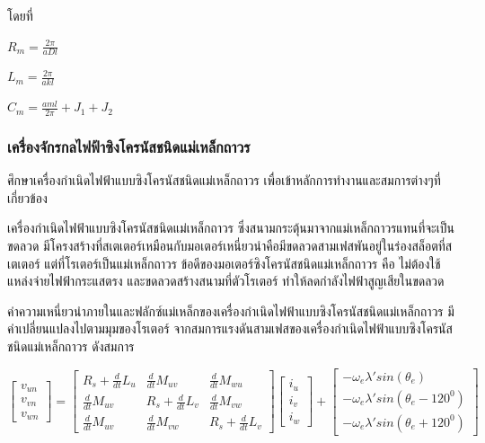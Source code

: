 \documentclass[11pt,a4paper]{article}
\begin{document}
โดยที่

$R_{m} = \frac{2\pi}{aDl}$

$L_{m} = \frac{2\pi}{akl}$

$C_{m} = \frac{aml}{2\pi} + J_{1} + J_{2}$  


\subsubsection{เครื่องจักรกลไฟฟ้าซิงโครนัสชนิดแม่เหล็กถาวร}
ศึกษาเครื่องกำเนิดไฟฟ้าแบบซิงโครนัสชนิดแม่เหล็กถาวร \cite{sswch4} \cite{PMSM} เพื่อเข้าหลักการทำงานและสมการต่างๆที่เกี่ยวข้อง

เครื่องกำเนิดไฟฟ้าแบบซิงโครนัสชนิดแม่เหล็กถาวร ซึ่งสนามกระตุ้นมาจากแม่เหล็กถาวรแทนที่จะเป็นขดลวด มีโครงสร้างที่สเตเตอร์เหมือนกับมอเตอร์เหนี่ยวนำคือมีขดลวดสามเฟสพันอยู่ในร่องสล็อตที่สเตเตอร์ แต่ที่โรเตอร์เป็นแม่เหล็กถาวร ข้อดีของมอเตอร์ซิงโครนัสชนิดแม่เหล็กถาวร คือ ไม่ต้องใช้แหล่งจ่ายไฟฟ้ากระแสตรง และขดลวดสร้างสนามที่ตัวโรเตอร์ ทำให้ลดกำลังไฟฟ้าสูญเสียในขดลวด

ค่าความเหนี่ยวนำภายในและฟลักซ์แม่เหล็กของเครื่องกำเนิดไฟฟ้าแบบซิงโครนัสชนิดแม่เหล็กถาวร มีค่าเปลี่ยนแปลงไปตามมุมของโรเตอร์ จากสมการแรงดันสามเฟสของเครื่องกำเนิดไฟฟ้าแบบซิงโครนัสชนิดแม่เหล็กถาวร ดังสมการ

\begin{equation}
    \begin{bmatrix}
        v_{un} \\v_{vn} \\v_{wn}
    \end{bmatrix}=
    \begin{bmatrix}
        R_{s}+\frac{d}{dt}L_{u} & \frac{d}{dt}M_{uv}      & \frac{d}{dt}M_{wu}      \\
        \frac{d}{dt}M_{uv}      & R_{s}+\frac{d}{dt}L_{v} & \frac{d}{dt}M_{vw}      \\
        \frac{d}{dt}M_{uv}      & \frac{d}{dt}M_{vw}      & R_{s}+\frac{d}{dt}L_{v}
    \end{bmatrix}
    \begin{bmatrix}
        i_{u} \\i_{v} \\i_{w}
    \end{bmatrix}+
    \begin{bmatrix}
        -\omega_{e} \lambda' sin(\theta_{e}) \\-\omega_{e} \lambda' sin(\theta_{e} - 120^0) \\-\omega_{e} \lambda' sin(\theta_{e}+120^0)
    \end{bmatrix}
\end{equation}
\end{document}
